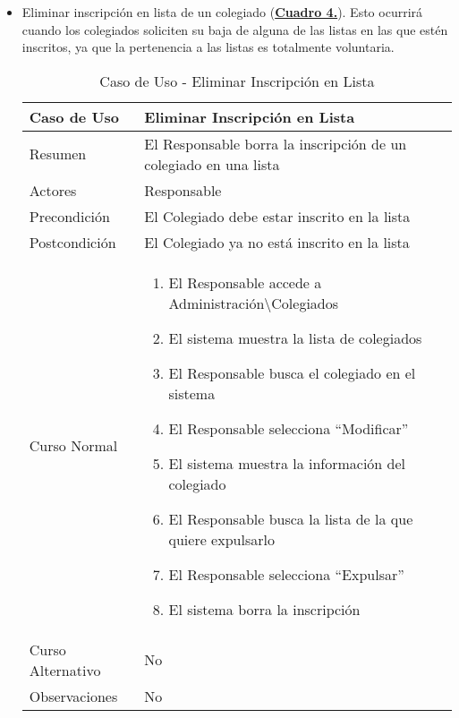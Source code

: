 \begin{itemize}
    \newpage~
		\item \addtocounter{tabla}{1} Eliminar inscripción en lista de un colegiado (\textbf{\hyperref[tab:curEliminarInscrLst]{Cuadro 4.}}). Esto ocurrirá cuando los colegiados soliciten su baja de alguna de las listas en las que estén inscritos, ya que la pertenencia a las listas es totalmente voluntaria.
		\begin{table}[!htbp]
		  \centering  \addtocounter{casouso}{1}
		  \begin{tabular}{|l | p{100mm}|}
		    \textbf{Caso de Uso}  & \textbf{Eliminar Inscripción en Lista} \\ \hline
		    Resumen 		 & El Responsable borra la inscripción de un colegiado en una lista \\ \hline
		    Actores  		 & Responsable \\ \hline
		    Precondición  	 & El Colegiado debe estar inscrito en la lista \\ \hline
		    Postcondición  	 & El Colegiado ya no está inscrito en la lista \\ \hline
		    Curso Normal   	 & \begin{enumerate}
			  \item El Responsable accede a Administración\textbackslash Colegiados
			  \item El sistema muestra la lista de colegiados
			  \item El Responsable busca el colegiado en el sistema
			  \item El Responsable selecciona ``Modificar''
			  \item El sistema muestra la información del colegiado
			  \item El Responsable busca la lista de la que quiere expulsarlo
			  \item El Responsable selecciona ``Expulsar''
			  \item El sistema borra la inscripción
		    \end{enumerate}  \\ \hline
		    Curso Alternativo  & No  \\ \hline
		    Observaciones 	 & No \\ \hline
		  \end{tabular}
		  \caption{Caso de Uso  - Eliminar Inscripción en Lista}
		  \label{tab:curEliminarInscrLst}
		\end{table}
		\FloatBarrier
\end{itemize}

